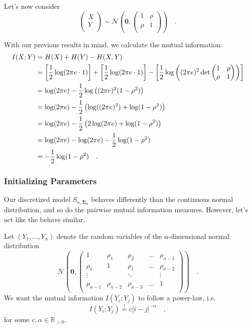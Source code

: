 \documentclass[../../main.tex]{subfiles}
\begin{document}
Let's now consider
\[
    \begin{pmatrix*}
        X \\
        Y \\
    \end{pmatrix*}
    \sim \mathcal{N}\left(\bm{0}, \begin{pmatrix*}
        1 & \rho \\
        \rho & 1 \\
    \end{pmatrix*}\right)
    \quad .
\]

With our previous results in mind, we calculate the mutual information:
\begin{align}
    I(X; Y) &= H(X) + H(Y) - H(X, Y) \notag \\
    &= \left[ \frac{1}{2} \log(2\pi e \cdot 1) \right] + \left[ \frac{1}{2} \log(2\pi e \cdot 1) \right] - \left[ \frac{1}{2} \log\left( (2\pi e)^2 \det\begin{pmatrix*} 1 & \rho \\ \rho & 1 \end{pmatrix*} \right) \right] \notag \\
    &= \log(2\pi e) - \frac{1}{2} \log\left( (2\pi e)^2 (1-\rho^2) \right) \notag \\
    &= \log(2\pi e) - \frac{1}{2} \left( \log((2\pi e)^2) + \log(1-\rho^2) \right) \notag \\
    &= \log(2\pi e) - \frac{1}{2} \left( 2\log(2\pi e) + \log(1-\rho^2) \right) \notag \\
    &= \log(2\pi e) - \log(2\pi e) - \frac{1}{2}\log(1-\rho^2) \notag \\
    &= -\frac{1}{2}\log(1-\rho^2) \label{eq:gauss_mutual_information} \quad .
\end{align}

\subsubsection{Initializing Parameters}
\label{sec:initializing_parameters}
Our discretized model $S_{n, \bm{\Sigma}_n}$ behaves differently than the continuous normal distribution, and so do the pairwise mutual information measures. However, let's act like the behave similar.

Let $(Y_1, \dots, Y_n)$ denote the random variables of the n-dimensional normal distribution
\[
    \mathcal{N}\left(\bm{0}, \begin{pmatrix*}
        1& \rho_1& \rho_2& \dots & \rho_{n-1} \\
        \rho_1& 1& \rho_1& \dots & \rho_{n-2} \\
        \vdots &  & \ddots & & \vdots \\
        \rho_{n-1} & \rho_{n-2} & \rho_{n-3} & \dots & 1 \\
    \end{pmatrix*}\right) \quad .
\]
We want the mutual information $I(Y_i; Y_j)$ to follow a power-law, i.e.
\[
    I(Y_i; Y_j) \overset{!}{=} c |i-j|^{-\alpha} \quad ,
\]
for some $c, \alpha \in \mathbb{R}_{>0}$.
\end{document}
